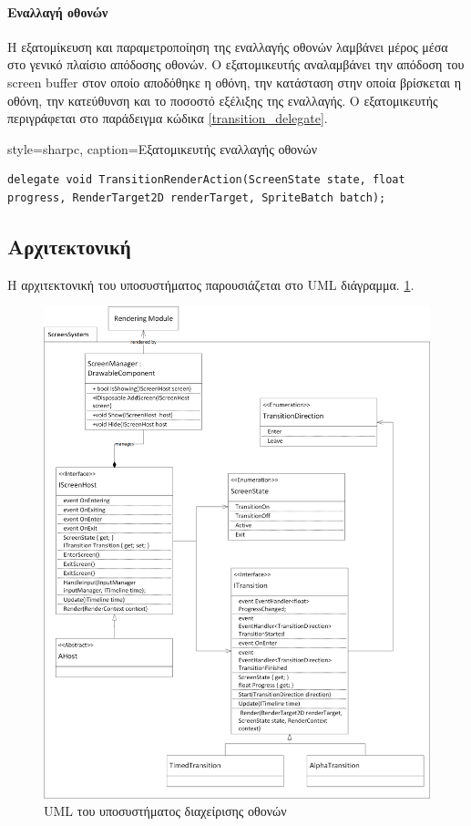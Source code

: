 	\paragraph{Εναλλαγή οθονών}
	Η εξατομίκευση και παραμετροποίηση της εναλλαγής οθονών λαμβάνει μέρος μέσα στο γενικό πλαίσιο απόδοσης οθονών. Ο εξατομικευτής αναλαμβάνει την απόδοση του screen buffer στον οποίο αποδόθηκε η οθόνη, την κατάσταση στην οποία βρίσκεται η οθόνη, την κατεύθυνση και το ποσοστό εξέλιξης της εναλλαγής. Ο εξατομικευτής περιγράφεται στο παράδειγμα κώδικα \ref{transition_delegate}.
			
	\lstset
	{
		style=sharpc, 
		caption={Εξατομικευτής εναλλαγής οθονών}
	}
	\begin{lstlisting}[label={transition_delegate}]	
delegate void TransitionRenderAction(ScreenState state, float progress, RenderTarget2D renderTarget, SpriteBatch batch);
	\end{lstlisting}
	
	\newpage
	\subsection{Αρχιτεκτονική}
Η αρχιτεκτονική του υποσυστήματος παρουσιάζεται στο \gls{UML} διάγραμμα. \ref{fig:core_screensystem}.
	\begin{figure}[h!]	
		\centering
		\includegraphics[width=160mm]{Images/core_screensystem}
		\caption{UML του υποσυστήματος διαχείρισης οθονών}
		\label{fig:core_screensystem}
	\end{figure}		
	

